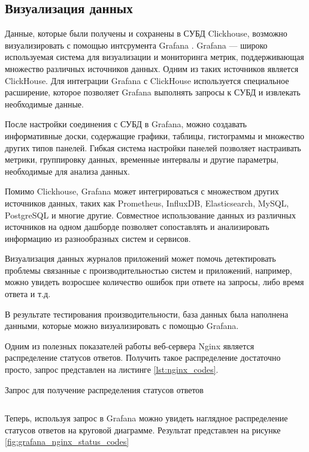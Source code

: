 \documentclass[14pt, russian]{scrartcl}
\begin{document}
\subsection{Визуализация данных}

Данные, которые были получены и сохранены в СУБД Clickhouse, возможно визуализировать с помощью интсрумента Grafana \cite{Grafana}. 
Grafana --- широко используемая система для визуализации и мониторинга метрик, поддерживающая множество различных источников данных.
Одним из таких источников является ClickHouse. Для интеграции Grafana с ClickHouse используется специальное расширение, которое позволяет Grafana выполнять
запросы к СУБД и извлекать необходимые данные.

После настройки соединения с СУБД в Grafana, можно создавать информативные доски, содержащие графики, таблицы, гистограммы и множество других типов панелей.
Гибкая система настройки панелей позволяет настраивать метрики, группировку данных, временные интервалы и другие параметры,
необходимые для анализа данных.

Помимо Clickhouse, Grafana может интегрироваться с множеством других источников данных, таких как Prometheus, InfluxDB, Elasticsearch, MySQL, PostgreSQL и многие другие. Совместное использование данных из различных источников на одном дашборде позволяет сопоставлять и анализировать информацию из разнообразных систем и сервисов.

Визуализация данных журналов приложений может помочь детектировать проблемы связанные с производительностью систем и приложений, например, можно увидеть возросшее количество ошибок при ответе на запросы, либо время ответа и т.д.

В результате тестирования производительности, база данных была наполнена данными, которые можно визуализировать с помощью Grafana. 

Одним из полезных показателей работы веб-сервера Nginx является распределение статусов ответов. Получить такое распределение достаточно просто, запрос представлен на листинге \ref{lst:nginx_codes}.

\begin{listing}[H]
	\caption{Запрос для получение распределения статусов ответов}
	\label{lst:nginx_codes}
	\inputminted[style=bw, frame=single,fontsize = \footnotesize, linenos=false, xleftmargin = 1.5em]{sql}{./listings/codes.sql}
\end{listing}

Теперь, используя запрос в Grafana можно увидеть наглядное распределение статусов ответов на круговой диаграмме. Результат представлен на рисунке \ref{fig:grafana_nginx_status_codes}
\end{document}
